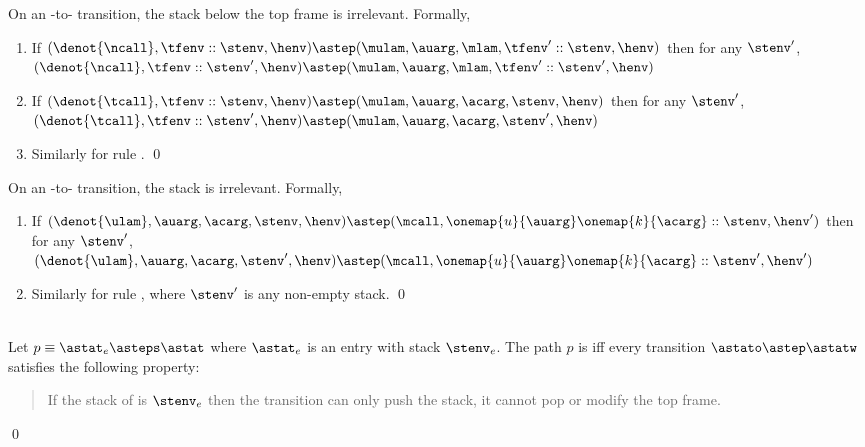 \documentclass{LMCS}
\theoremstyle{definition} \newtheorem{property}[thm]{Property}
\begin{document}
\begin{lem} \label{lem:stack-eval}
  On an \daeval{}-to-\daapply{} transition, the stack below the top frame is 
  irrelevant. 
  Formally,
  \begin{enumerate}[$\bullet$]
  \item 
    If $(\denot{\ncall}, \tfenv::\stenv, \henv) \astep
    (\mulam, \auarg, \mlam, \tfenv'::\stenv, \henv)$ then for any $\stenv'$, \\
    $(\denot{\ncall}, \tfenv::\stenv', \henv) \astep
    (\mulam, \auarg, \mlam, \tfenv'::\stenv', \henv)$
  \item
    If $(\denot{\tcall}, \tfenv::\stenv, \henv) \astep
    (\mulam, \auarg, \acarg, \stenv, \henv)$
    then for any $\stenv'$, \\
    $(\denot{\tcall}, \tfenv::\stenv', \henv) \astep
    (\mulam, \auarg, \acarg, \stenv', \henv)$
  \item
    Similarly for rule .
    \qed
  \end{enumerate}
\end{lem}

\begin{lem} \label{lem:stack-apply}
  On an \daapply{}-to-\daeval{} transition, the stack is irrelevant.
  Formally, 
  \begin{enumerate}[$\bullet$]
  \item 
    If $(\denot{\ulam}, \auarg, \acarg, \stenv, \henv) \astep
    (\mcall, \onemap{u}{\auarg}\onemap{k}{\acarg}::\stenv, \henv')$
    then for any $\stenv'$, \\
    $(\denot{\ulam}, \auarg, \acarg, \stenv', \henv) \astep 
    (\mcall, \onemap{u}{\auarg}\onemap{k}{\acarg}::\stenv', 
    \henv')$
  \item
    Similarly for rule , where $\stenv'$ is any non-empty stack.
    \qed
  \end{enumerate}
\end{lem}

\newcommand{\entry}{\ensuremath{\astat_e}}
\begin{defi}\label{def:push-monotonic} ~\\
  Let $p \equiv \entry \asteps \astat$ 
  where \entry{} is an entry with stack $\stenv_e$.
  The path $p$ is  iff every transition $\astato \astep 
  \astatw$ satisfies the following property:
  \begin{quote}
    If the stack of \astato{} is $\stenv_e$ then the transition can only push
    the stack, it cannot pop or modify the top frame.
  \end{quote}
  \qed
\end{defi}
\end{document}
